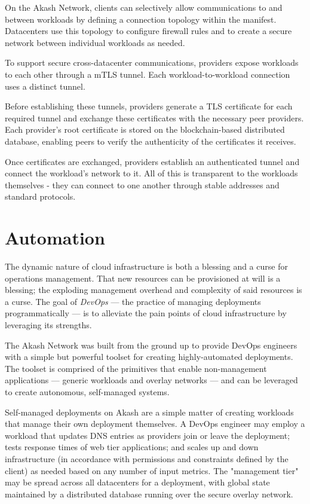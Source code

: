 \documentclass[11pt,english]{article}
\theoremstyle{definition}
\begin{document}
On the Akash Network, clients can selectively allow communications to and between workloads by defining a connection topology within the manifest. Datacenters use this topology to configure firewall rules and to create a secure network between individual workloads as needed.

To support secure cross-datacenter communications, providers expose workloads to each other through a mTLS tunnel. Each workload-to-workload connection uses a distinct tunnel.

Before establishing these tunnels, providers generate a TLS certificate for each required tunnel and exchange these certificates with the necessary peer providers.  Each provider's root certificate is stored on the blockchain-based distributed database, enabling peers to verify the authenticity of the certificates it receives.

Once certificates are exchanged, providers establish an authenticated tunnel and connect the workload's network to it.  All of this is transparent to the workloads themselves - they can connect to one another through stable addresses and standard protocols.

\section{Automation}
The dynamic nature of cloud infrastructure is both a blessing and a curse for operations management.  That new resources can be provisioned at will is a blessing; the exploding management overhead and complexity of said resources is a curse.  The goal of \textit{DevOps} --- the practice of managing deployments programmatically --- is to alleviate the pain points of cloud infrastructure by leveraging its strengths.

The Akash Network was built from the ground up to provide DevOps engineers with a simple but powerful toolset for creating highly-automated deployments.  The toolset is comprised of the primitives that enable non-management applications --- generic workloads and overlay networks --- and can be leveraged to create autonomous, self-managed systems.

Self-managed deployments on Akash are a simple matter of creating workloads that manage their own deployment themselves.  A DevOps engineer may employ a workload that updates DNS entries as providers join or leave the deployment; tests response times of web tier applications; and scales up and down infrastructure (in accordance with permissions and constraints defined by the client) as needed based on any number of input metrics.  The "management tier" may be spread across all datacenters for a deployment, with global state maintained by a distributed database running over the secure overlay network.
\end{document}
